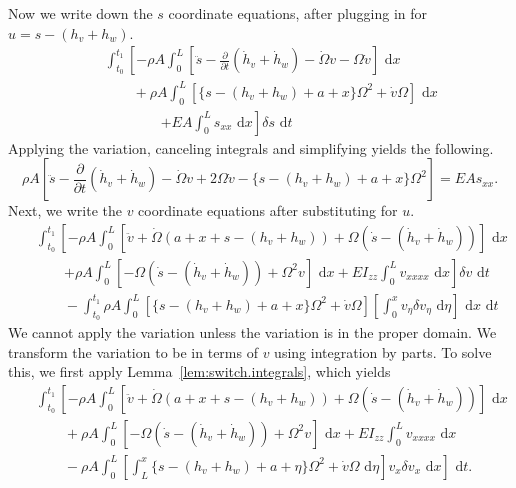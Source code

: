 Now we write down the $s$ coordinate equations, after plugging in for $u = s-(h_v+h_w)$.
\begin{eqnarray}
& & \int_{t_0}^{t_1}\left[-\rho A\int_0^L  \left[\ddot s-\frac{\partial}{\partial t}(\dot h_v+\dot h_w)-\dot \Omega v-\Omega \dot v\right]\text{ d}x\right. \nonumber \\
& & \qquad +\rho A\int_0^L  [\lbrace s-(h_v+h_w)+a+x\rbrace\Omega^2+\dot v\Omega]\text{ d}x \\
& & \qquad \qquad \left.+EA\int_0^L s_{xx}\text{ d}x \right]\delta s\text{ d}t\nonumber
\end{eqnarray}
Applying the variation, canceling integrals and simplifying yields the following.
\begin{equation}
\rho A \left[\ddot s-\frac{\partial}{\partial t}(\dot h_v+\dot h_w)-\dot \Omega v+2\Omega\dot v-\lbrace s-(h_v+h_w)+a+x\rbrace\Omega^2\right] = EAs_{xx}.
\end{equation}
Next, we write the $v$ coordinate equations after substituting for $u$.
\begin{eqnarray}
& & \int_{t_0}^{t_1}\left[-\rho A \int_0^L [\ddot v + \dot \Omega (a+x+s-(h_v+h_w))+\Omega(\dot s - (\dot h_v+\dot h_w))]\text{ d}x\right.\nonumber \\ 
& & \qquad\left. +\rho A\int_0^L  [-\Omega(\dot s-(\dot h_v+\dot h_w))+\Omega^2v] \text{ d}x + EI_{zz}\int_0^L v_{xxxx}\text{ d}x\right]\delta v\text{ d}t\\
& & \qquad -\int_{t_0}^{t_1}\rho A\int_0^L [\lbrace s-(h_v+h_w)+a+x\rbrace\Omega^2+\dot v\Omega]\left[\int_0^xv_{\eta}\delta v_{\eta}\text{ d}\eta\right]\text{ d}x\text{ d}t\nonumber
\end{eqnarray}
We cannot apply the variation unless the variation is in the proper domain. We transform the variation to be in terms of $v$ using integration by parts. To solve this, we first apply Lemma~\ref{lem:switch.integrals}, which yields
\begin{eqnarray}
& & \int_{t_0}^{t_1}\left[-\rho A \int_0^L [\ddot v + \dot \Omega (a+x+s-(h_v+h_w))+\Omega(\dot s - (\dot h_v+\dot h_w))]\text{ d}x\right.\nonumber \\ 
& & \qquad +\rho A\int_0^L  [-\Omega(\dot s-(\dot h_v+\dot h_w))+\Omega^2v] \text{ d}x + EI_{zz}\int_0^L v_{xxxx}\text{ d}x\\
& & \qquad -\left.\rho A\int_0^L \left[\int_L^x\lbrace s-(h_v+h_w)+a+\eta\rbrace\Omega^2+\dot v\Omega\text{ d}\eta\right] v_{x}\delta v_x\text{ d}x\right]\text{ d}t.\nonumber
\end{eqnarray}
